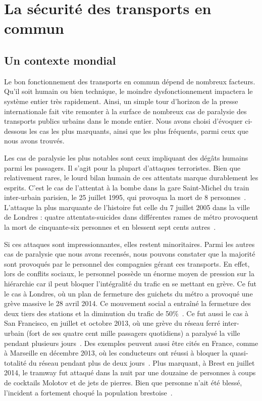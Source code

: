 \section{La sécurité des transports en commun}
    \subsection{Un contexte mondial}
        Le bon fonctionnement des transports en commun dépend de nombreux facteurs. Qu'il soit humain ou bien technique, le moindre dysfonctionnement impactera le système entier très rapidement. Ainsi, un simple tour d'horizon de la presse internationale fait vite remonter à la surface de nombreux cas de paralysie des transports publics urbains dans le monde entier. Nous avons choisi d'évoquer ci-dessous les cas les plus marquants, ainsi que les plus fréquents, parmi ceux que nous avons trouvés. 
             
        Les cas de paralysie les plus notables sont ceux impliquant des dégâts humains parmi les passagers. Il s'agit pour la plupart d'attaques terroristes. Bien que relativement rares, le lourd bilan humain de ces attentats marque durablement les esprits.  C'est le cas de l'attentat à la bombe dans la gare Saint-Michel du train inter-urbain parisien, le 25 juillet 1995, qui provoqua la mort de 8 personnes~\cite{stmichel}. L'attaque la plus marquante de l'histoire fut celle du 7 juillet 2005 dans la ville de Londres : quatre attentats-suicides dans différentes rames de métro provoquent la mort de cinquante-six personnes et en blessent sept cents autres~\cite{london_attacks}.
        
        Si ces attaques sont impressionnantes, elles restent minoritaires. Parmi les autres cas de paralysie que nous avons recensés, nous pouvons constater que la majorité sont provoqués par le personnel des compagnies gérant ces transports. En effet, lors de conflits sociaux, le personnel possède un énorme moyen de pression sur la hiérarchie car il peut bloquer l'intégralité du trafic en se mettant en grève.  Ce fut le cas à Londres, où un plan de fermeture des guichets du métro a provoqué une grève massive le 28 avril 2014. Ce mouvement social a entraîné la fermeture des deux tiers des stations et la diminution du trafic de 50\%~\cite{tubeApril}. Ce fut aussi le cas à San Francisco, en juillet et octobre 2013, où une grève du réseau ferré inter-urbain (fort de ses quatre cent mille passagers quotidiens) a paralysé la ville pendant plusieurs jours~\cite{SFbart}. Des exemples peuvent aussi être cités en France, comme à Marseille en décembre 2013, où les conducteurs ont réussi à bloquer la quasi-totalité du réseau pendant plus de deux jours~\cite{greve_marseille}. Plus marquant, à Brest en juillet 2014, le tramway fut attaqué dans la  nuit par une douzaine de personnes à coups de cocktails Molotov et de jets de pierres. Bien que personne n'ait été blessé, l'incident a fortement choqué la population brestoise~\cite{molotov}.
            

